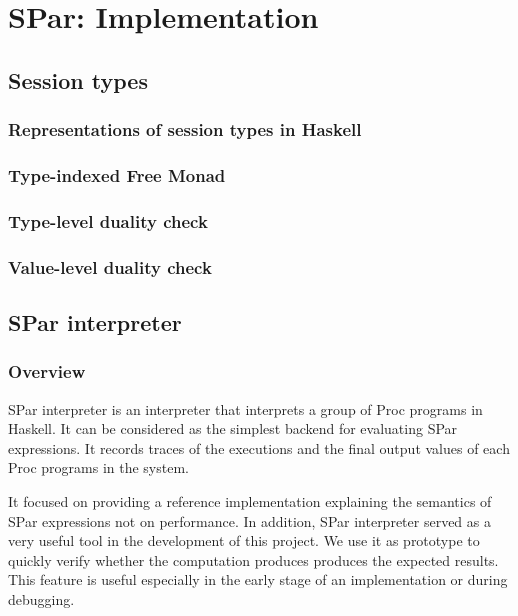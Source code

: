 \chapter{SPar: Implementation}
\section{Session types} \label{impl:sec:session}
\subsection{Representations of session types in Haskell}
\subsection{Type-indexed Free Monad}
\subsection{Type-level duality check}
\subsection{Value-level duality check}
\section{SPar interpreter} \label{impl:sec:interp}
\subsection{Overview}
SPar interpreter is an interpreter that interprets a group of Proc programs in Haskell. It can be considered as the simplest backend for evaluating SPar expressions. It records traces of the executions and the final output values of each Proc programs in the system. 

It focused on providing a reference implementation explaining the semantics of SPar expressions not on performance. In addition, SPar interpreter served as a very useful tool in the development of this project. We use it as prototype to quickly verify whether the computation produces produces the expected results. This feature is useful especially in the early stage of an implementation or during debugging.
